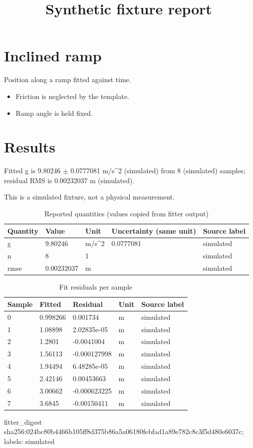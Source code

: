 \documentclass[11pt]{article}
\title{Synthetic fixture report}
\author{}\date{}
\begin{document}
\maketitle
\section*{Inclined ramp}
Position along a ramp fitted against time.

\begin{itemize}
\item Friction is neglected by the template.
\item Ramp angle is held fixed.
\end{itemize}
\section*{Results}
Fitted g is 9.80246 $\pm$ 0.0777081 m/s\textasciicircum{}2 (simulated) from 8 (simulated) samples; residual RMS is 0.00232037 m (simulated).

This is a simulated fixture, not a physical measurement.
\begin{longtable}{lllll}
\caption{Reported quantities (values copied from fitter output)}\\ \hline
Quantity & Value & Unit & Uncertainty (same unit) & Source label \\ \hline \endhead
g & 9.80246 & m/s\textasciicircum{}2 & 0.0777081 & simulated \\
n & 8 & 1 &  & simulated \\
rmse & 0.00232037 & m &  & simulated \\
\hline\end{longtable}
\begin{longtable}{lllll}
\caption{Fit residuals per sample}\\ \hline
Sample & Fitted & Residual & Unit & Source label \\ \hline \endhead
0 & 0.998266 & 0.001734 & m & simulated \\
1 & 1.08898 & 2.02835e-05 & m & simulated \\
2 & 1.2801 & -0.0041004 & m & simulated \\
3 & 1.56113 & -0.000127998 & m & simulated \\
4 & 1.94494 & 6.48285e-05 & m & simulated \\
5 & 2.42146 & 0.00453663 & m & simulated \\
6 & 3.00662 & -0.000623225 & m & simulated \\
7 & 3.6845 & -0.00150411 & m & simulated \\
\hline\end{longtable}
\noindent fitter\_digest sha256:024bc80b4466b105ff8d375b86a5a06180febfad1a89e782c8c3f5d480e6037c; labels: simulated
\end{document}
